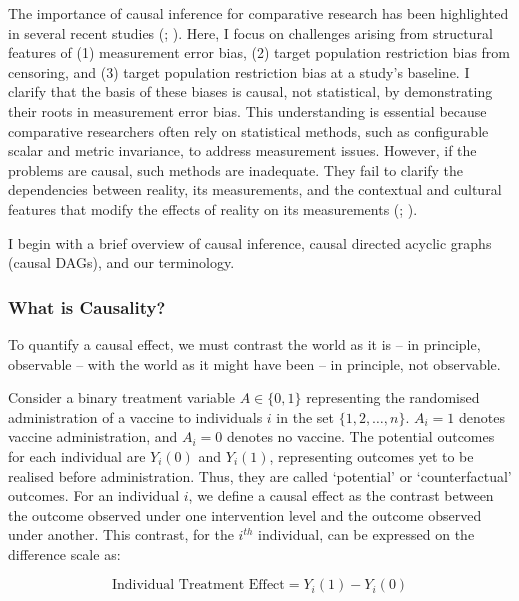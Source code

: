 \documentclass[
  single column]{article}
\begin{document}
The importance of causal inference for comparative research has been
highlighted in several recent studies
(;
). Here, I focus
on challenges arising from structural features of (1) measurement error
bias, (2) target population restriction bias from censoring, and (3)
target population restriction bias at a study's baseline. I clarify that
the basis of these biases is causal, not statistical, by demonstrating
their roots in measurement error bias. This understanding is essential
because comparative researchers often rely on statistical methods, such
as configurable scalar and metric invariance, to address measurement
issues. However, if the problems are causal, such methods are
inadequate. They fail to clarify the dependencies between reality, its
measurements, and the contextual and cultural features that modify the
effects of reality on its measurements
(;
).

I begin with a brief overview of causal inference, causal directed
acyclic graphs (causal DAGs), and our terminology.

\subsubsection{What is Causality?}\label{what-is-causality}

To quantify a causal effect, we must contrast the world as it is -- in
principle, observable -- with the world as it might have been -- in
principle, not observable.

Consider a binary treatment variable \(A \in \{0,1\}\) representing the
randomised administration of a vaccine to individuals \(i\) in the set
\(\{1, 2, \ldots, n\}\). \(A_i = 1\) denotes vaccine administration, and
\(A_i = 0\) denotes no vaccine. The potential outcomes for each
individual are \(Y_i(0)\) and \(Y_i(1)\), representing outcomes yet to
be realised before administration. Thus, they are called `potential' or
`counterfactual' outcomes. For an individual \(i\), we define a causal
effect as the contrast between the outcome observed under one
intervention level and the outcome observed under another. This
contrast, for the \(i^{th}\) individual, can be expressed on the
difference scale as:

\[
\text{Individual Treatment Effect} = Y_i(1) - Y_i(0)
\]
\end{document}
